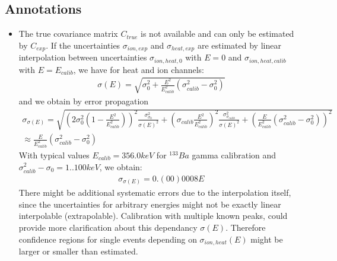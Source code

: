 \subsection*{Annotations}
\begin{itemize}
\item The true covariance matrix $C_{true}$ is not available and can only be estimated by $C_{exp}$. If the uncertainties $\sigma_{ion,exp}$ and $\sigma_{heat,exp}$ are estimated by linear interpolation between uncertainties $\sigma_{ion,heat,0}$ with $E = 0$ and $\sigma_{ion,heat,calib}$ with $E=E_{calib}$, we have for heat and ion channels:
\begin{gather}
\sigma(E) = \sqrt{ \sigma_{0}^2 + \frac{E^2}{E_{calib}^2} (\sigma_{calib}^2 - \sigma_{0}^2 )}
\end{gather}
and we obtain by error propagation
\begin{gather}
\sigma_{\sigma(E)} = \sqrt{ \left( 2 \sigma_{0}^2 \left(1- \frac{E^2}{E_{calib}^2} \right) \right)^2 \frac{\sigma_{\sigma_{0}}^2}{\sigma(E)^2} + \left( \sigma_{calib} \frac{E^2}{E_{calib}^2} \right)^2 \frac{\sigma_{\sigma_{calib}}^2}{\sigma(E)^2} + \left( \frac{E}{E_{calib}^2} \left(\sigma_{calib}^2 - \sigma_{0}^2 \right) \right)^2} \\
\approx \frac{E}{E_{calib}^2} \left(\sigma_{calib}^2 - \sigma_{0}^2 \right)
\end{gather}
With typical values $E_{calib} = 356.0 keV$ for $^{133}Ba$ gamma calibration and $\sigma_{calib}^2 - \sigma_{0} = 1..100 keV$, we obtain:
\begin{gather}
\sigma_{\sigma(E)} = 0.(00)0008 E
\end{gather}
There might be additional systematic errors due to the interpolation itself, since the uncertainties for arbitrary energies might not be exactly linear interpolable (extrapolable). Calibration with multiple known peaks, could provide more clarification about this dependancy $\sigma(E)$.
Therefore confidence regions for single events depending on $\sigma_{ion,heat}(E)$ might be larger or smaller than estimated. 
\end{itemize}






